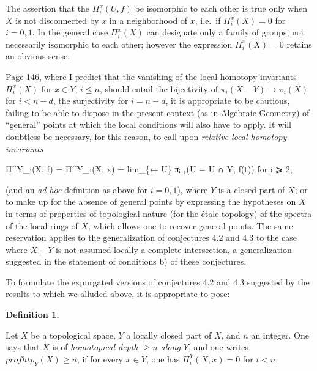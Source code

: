 \documentclass[
  11pt,
  a4paper,
]{book}
\newenvironment{Shaded}{}{}
\newcommand{\NormalTok}[1]{#1}
\begin{document}
The assertion that the \(\Pi^{x}_{i}(U, f)\) be isomorphic to each other
is true only when \(X\) is not disconnected by \(x\) in a neighborhood
of \(x\), i.e.~if \(\Pi^{x}_{i}(X) = 0\) for \(i = 0, 1\). In the
general case \(\Pi^{x}_{i}(X)\) can designate only a family of groups,
not necessarily isomorphic to each other; however the expression
\(\Pi^{x}_{i}(X) = 0\) retains an obvious sense.

Page 146, where I predict that the vanishing of the local homotopy
invariants \(\Pi^{x}_{i}(X)\) for \(x \in Y\), \(i
\leqslant n\), should entail the bijectivity of
\(\pi_{i}(X - Y) \to \pi_{i}(X)\) for \(i < n - d\), the surjectivity
for \(i
= n - d\), it is appropriate to be cautious, failing to be able to
dispose in the present context (as in Algebraic Geometry) of ``general''
points at which the local conditions will also have to apply. It will
doubtless be necessary, for this reason, to call upon \emph{relative
local homotopy invariants}

\begin{Shaded}
\begin{Highlighting}[]
\NormalTok{Π\^{}Y\_i(X, f) = Π\^{}Y\_i(X, x) = lim\_\{← U\} πᵢ₋₁(U − U ∩ Y, f(t))   for i ⩾ 2,}
\end{Highlighting}
\end{Shaded}

(and an \emph{ad hoc} definition as above for \(i = 0, 1\)), where \(Y\)
is a closed part of \(X\); or to make up for the absence of general
points by expressing the hypotheses on \(X\) in terms of properties of
topological nature (for the étale topology) of the spectra of the local
rings of \(X\), which allows one to recover general points. The same
reservation applies to the generalization of conjectures 4.2 and 4.3 to
the case where \(X - Y\) is not assumed locally a complete intersection,
a generalization suggested in the statement of conditions b) of these
conjectures.

To formulate the expurgated versions of conjectures 4.2 and 4.3
suggested by the results to which we alluded above, it is appropriate to
pose:

\textbf{Definition 1.}

Let \(X\) be a topological space, \(Y\) a locally closed part of \(X\),
and \(n\) an integer. One says that \(X\) is of \emph{homotopical depth
\(\geqslant n\) along \(Y\)}, and one writes
\(prof htp_{Y}(X) \geqslant n\), if for every \(x \in Y\), one has
\(\Pi^{Y}_{i}(X, x) = 0\) for \(i < n\).
\end{document}
